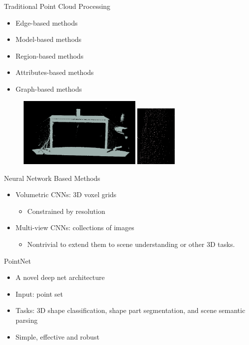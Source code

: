 \documentclass[serif,mathserif]{beamer}
\begin{document}
\begin{frame}{Traditional Point Cloud Processing}
		\begin{itemize}
			\item Edge-based methods
			\item Model-based methods
			\item Region-based methods
			\item Attributes-based methods
			\item Graph-based methods
		\end{itemize}
		\begin{figure}
			\includegraphics[width=6cm]{image/desk.png} 
			\includegraphics[width=2cm]{image/leg.png} 
		\end{figure}
	
\end{frame}

\begin{frame}{Neural Network Based Methods}
	\begin{itemize}
		\item Volumetric CNNs: 3D voxel grids
		\begin{itemize}
			\item Constrained by resolution
		\end{itemize}
		\item Multi-view CNNs: collections of images
		\begin{itemize}
			\item Nontrivial to extend them to scene understanding or other 3D tasks.
		\end{itemize}
	\end{itemize}
\end{frame}

\begin{frame}{PointNet}
	\begin{itemize}
		\item A novel deep net architecture
		\item Input: point set
		\item Tasks: 3D shape classification, shape part segmentation, and scene semantic parsing 
		\item Simple, effective and robust
	\end{itemize}
\end{frame}
\end{document}
